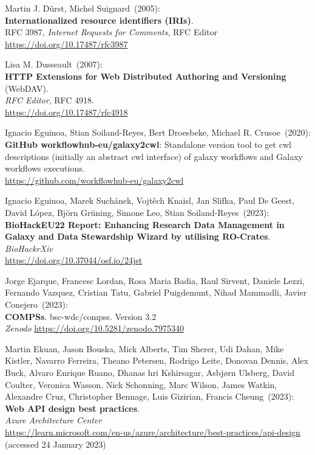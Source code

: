 \begin{thebibliography}{9}
Martin J. Dürst, Michel Suignard~(2005): \\
\textbf{Internationalized resource identifiers (IRIs)}.\\
RFC 3987, \emph{Internet Requests for Comments}, RFC Editor\\
\url{https://doi.org/10.17487/rfc3987}

Lisa M. Dusseault~(2007): \\
\textbf{HTTP Extensions for Web Distributed Authoring and Versioning} (WebDAV). \\
\emph{RFC Editor}, RFC 4918.\\
\url{https://doi.org/10.17487/rfc4918}

Ignacio Eguinoa, Stian Soiland-Reyes, Bert Droesbeke, Michael
R. Crusoe~(2020): \\
\textbf{GitHub workflowhub-eu/galaxy2cwl}: Standalone version tool to
get cwl descriptions (initially an abstract cwl interface) of galaxy
workflows and Galaxy workflows executions.\\
\url{https://github.com/workflowhub-eu/galaxy2cwl}

Ignacio Eguinoa, Marek Suchánek, Vojtěch Knaisl, Jan Slifka, Paul De Geest, David López, Björn Grüning, Simone Leo, Stian Soiland-Reyes~(2023): \\
\textbf{BioHackEU22 Report: Enhancing Research Data Management in Galaxy and Data Stewardship Wizard by utilising RO-Crates}.\\
\emph{BioHackrXiv}\\
\url{https://doi.org/10.37044/osf.io/24jst}

Jorge Ejarque, Francesc Lordan, Rosa Maria Badia, Raul Sirvent, Daniele Lezzi, Fernando Vazquez, Cristian Tatu,  Gabriel Puigdemunt, Nihad Mammadli, Javier Conejero~(2023): \\
\textbf{COMPSs}. bsc-wdc/compss. Version 3.2\\
\emph{Zenodo}
\url{https://doi.org/10.5281/zenodo.7975340}

Martin Ekuan, Jason Bouska, Mick Alberts, Tim Sherer, Udi Dahan, Mike Kistler, Navarro Ferreira, Theano Petersen, Rodrigo Leite, Donovan Dennis, Alex Buck, Alvaro Enrique Ruano, Dhanas
hri Kshirsagar, Asbjørn Ulsberg, David Coulter, Veronica Wasson, Nick Schonning, Marc Wilson, James Watkin, Alexandre Cruz, Christopher Bennage, Luis Gizirian, Francis Cheung~(2023): \\
\textbf{Web {API} design best practices}.\\
\emph{Azure Architecture Center}\\
\url{https://learn.microsoft.com/en-us/azure/architecture/best-practices/api-design}
(accessed 24 January 2023)


\end{thebibliography}
